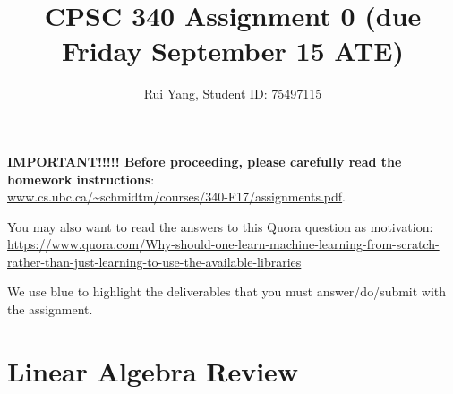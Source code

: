 \documentclass{article}
\def\blu#1{{\color{blu}#1}}
\begin{document}
\title{CPSC 340 Assignment 0 (due Friday September 15 ATE)}
 \author{Rui Yang, Student ID: 75497115}
\maketitle




\textbf{IMPORTANT!!!!! Before proceeding, please carefully read the homework instructions}:\\ \url{www.cs.ubc.ca/~schmidtm/courses/340-F17/assignments.pdf}.

You may also want to read the answers to this Quora question as motivation:\\
{\scriptsize \url{https://www.quora.com/Why-should-one-learn-machine-learning-from-scratch-rather-than-just-learning-to-use-the-available-libraries}}

We use \blu{blue} to highlight the deliverables that you must answer/do/submit with the assignment.

\section{Linear Algebra Review}
\end{document}

